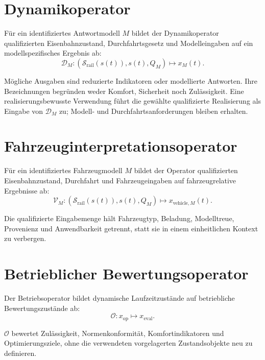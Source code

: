 \section{Dynamikoperator}

\begin{definition}[Dynamikoperator]
\label{def:runtime-dynamics-operator-operator-chapter}
Für ein identifiziertes Antwortmodell \(M\) bildet der Dynamikoperator
qualifizierten Eisenbahnzustand, Durchfahrtsgesetz und Modelleingaben auf ein
modellspezifisches Ergebnis ab:
\[
\mathcal D_M:
(\mathcal S_{\mathrm{rail}}(s(t)),s(t),Q_M)\mapsto x_M(t).
\]
\end{definition}
Mögliche Ausgaben sind reduzierte Indikatoren oder modellierte Antworten.
Ihre Bezeichnungen begründen weder Komfort, Sicherheit noch Zulässigkeit. Eine
realisierungsbewusste Verwendung führt die gewählte qualifizierte Realisierung
als Eingabe von \(\mathcal D_M\) zu; Modell- und Durchfahrtsanforderungen
bleiben erhalten.

\section{Fahrzeuginterpretationsoperator}

\begin{definition}[Fahrzeuginterpretationsoperator]
\label{def:runtime-vehicle-operator}
Für ein identifiziertes Fahrzeugmodell \(M\) bildet der Operator
qualifizierten Eisenbahnzustand, Durchfahrt und Fahrzeugeingaben auf
fahrzeugrelative Ergebnisse ab:
\[
\mathcal V_M:
(\mathcal S_{\mathrm{rail}}(s(t)),s(t),Q_M)
\mapsto x_{\mathrm{vehicle},M}(t).
\]
\end{definition}
Die qualifizierte Eingabemenge hält Fahrzeugtyp, Beladung, Modelltreue,
Provenienz und Anwendbarkeit getrennt, statt sie in einem einheitlichen
Kontext zu verbergen.

\section{Betrieblicher Bewertungsoperator}

\begin{definition}[Betriebsoperator]
\label{def:runtime-operational-operator}
Der Betriebsoperator bildet dynamische Laufzeitzustände auf betriebliche
Bewertungszustände ab:
\[
\mathcal O:x_{\mathrm{op}}\mapsto x_{\mathrm{eval}}.
\]
\end{definition}
\(\mathcal O\) bewertet Zulässigkeit, Normenkonformität, Komfortindikatoren
und Optimierungsziele, ohne die verwendeten vorgelagerten Zustandsobjekte neu
zu definieren.

